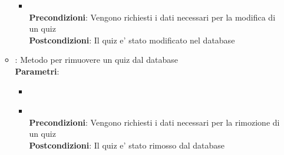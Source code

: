 \begin{itemize}
\begin{itemize}
\begin{itemize}
		\item{}\\
		\textbf{Precondizioni}: Vengono richiesti i dati necessari per la modifica di un quiz\\
		\textbf{Postcondizioni}: Il quiz e' stato modificato nel database\\
	\end{itemize}
	\item{} : Metodo per rimuovere un quiz dal database\\
	\textbf{Parametri}:
	\begin{itemize}
		\item{}\\
		\item{}\\
		\textbf{Precondizioni}: Vengono richiesti i dati necessari per la rimozione di un quiz\\
		\textbf{Postcondizioni}: Il quiz e' stato rimosso dal database\\
	\end{itemize}
\end{itemize}
\end{itemize}

